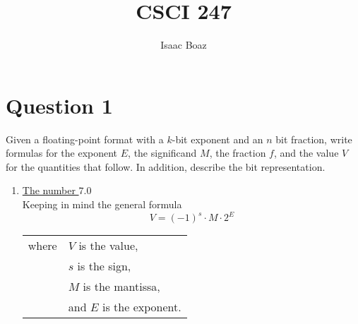 \documentclass{article}
\begin{document}
\title{CSCI 247}
\author{Isaac Boaz}
\maketitle

\section*{Question 1}
Given a floating-point format with a \(k\)-bit exponent and an \(n\) bit fraction, write formulas for the exponent \(E\), the significand \(M\), the fraction \(f\), and the value \(V\) for the quantities that follow. In addition, describe the bit representation.

\begin{enumerate}[label=\Alph*)]
    \item \underline{The number \(7.0\)} \\[\baselineskip]
    Keeping in mind the general formula 
    \[V = (-1)^s \cdot M \cdot 2^E\]
    \begin{tabular}{rl}
        where & \(V\) is the value, \\
        & \(s\) is the sign, \\
        & \(M\) is the mantissa, \\
        & and \(E\) is the exponent. \\
    \end{tabular}


\end{enumerate}
\end{document}
